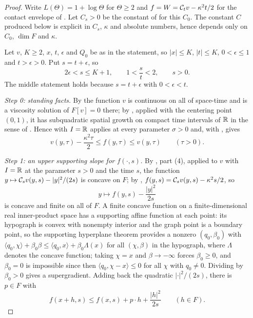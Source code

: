 \begin{proof}
Write $L(\Theta)=1+\log\Theta$ for $\Theta\ge2$ and
$f=W=\mathcal{C}_tv-\kappa^2t/2$ for the contact envelope of . Let
$C_s>0$ be the constant of  for this $C_0$. The
constant $C$ produced below is explicit in $C_s$, $\kappa$ and absolute
numbers, hence depends only on $C_0$, $\dim F$ and $\kappa$.

Let $v$, $K\ge2$, $x$, $t$, $\epsilon$ and $Q_0$ be as in the statement, so
$|x|\le K$, $|t|\le K$, $0<\epsilon\le1$ and $t>\epsilon>0$. Put $s=t+\epsilon$,
so
\begin{equation}\label{eq:dplv-s}
  2\epsilon<s\le K+1,\qquad 1<\frac st<2,\qquad s>0 .
\end{equation}
The middle statement holds because $s=t+\epsilon$ with $0<\epsilon<t$.

\emph{Step 0: standing facts.}
By  the function $v$ is continuous on all of space-time and
is a viscosity solution of $F[v]=0$ there; by ,
applied with the centering point $(0,1)$, it has subquadratic spatial growth on
compact time intervals of $\mathbb{R}$ in the sense of .
Hence  with $I=\mathbb{R}$ applies at every parameter
$\sigma>0$ and, with , gives
\begin{equation}\label{eq:dplv-sandwich}
  v(y,\tau)-\frac{\kappa^2\tau}{2}\le f(y,\tau)\le v(y,\tau)\qquad(\tau>0).
\end{equation}

\emph{Step 1: an upper supporting slope for $f(\cdot,s)$.}
By , part (4), applied to $v$ with $I=\mathbb{R}$ at the
parameter $s>0$ and the time $s$, the function
$y\mapsto\mathcal{C}_sv(y,s)-|y|^2/(2s)$ is concave on $F$; by ,
$f(y,s)=\mathcal{C}_sv(y,s)-\kappa^2s/2$, so
\[
  y\longmapsto f(y,s)-\frac{|y|^2}{2s}
\]
is concave and finite on all of $F$. A finite concave function on a
finite-dimensional real inner-product space has a supporting affine function at
each point: its hypograph is convex with nonempty interior and the graph point
is a boundary point, so the supporting hyperplane theorem provides a nonzero
$(q_0,\beta_0)$ with
$\langle q_0,\chi\rangle+\beta_0\beta\le\langle q_0,x\rangle+\beta_0\Lambda(x)$
for all $(\chi,\beta)$ in the hypograph, where $\Lambda$ denotes the concave
function; taking $\chi=x$ and $\beta\to-\infty$ forces $\beta_0\ge0$, and
$\beta_0=0$ is impossible since then $\langle q_0,\chi-x\rangle\le0$ for all
$\chi$ with $q_0\ne0$. Dividing by $\beta_0>0$ gives a supergradient. Adding
back the quadratic $|\cdot|^2/(2s)$, there is $p\in F$ with
\begin{equation}\label{eq:dp-W-upper-support}
  f(x+h,s)\le f(x,s)+p\cdot h+\frac{|h|^2}{2s}\qquad(h\in F).
\end{equation}


\end{proof}
